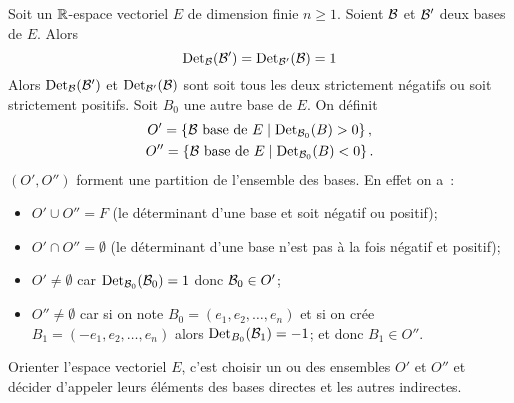 Soit un \(\mathbb{R}\)-espace vectoriel \(E\) de dimension finie \(n\geqslant 
1\). Soient \(\mathcal{B}\) et \(\mathcal{B}'\) deux bases de \(E\). Alors
\begin{equation}
  \operatorname{Det}_{\mathcal{B}}(\mathcal{B}') =  \operatorname{Det}_{\mathcal{B}'}(\mathcal{B}) = 1
\end{equation}
Alors \(\operatorname{Det}_{\mathcal{B}}(\mathcal{B}')\) et \(\operatorname{Det}_{\mathcal{B}'}(\mathcal{B})\) sont soit tous les deux 
strictement négatifs ou soit strictement positifs. Soit \(B_0\) une 
autre base de \(E\). On définit
\begin{gather}
  O'=\left\{\mathcal{B} \text{~base de~} E\mathrel{}\middle|\mathrel{}\operatorname{Det}_{\mathcal{B}_0}(B)>0\right\},\\
  O''=\left\{\mathcal{B} \text{~base de~} E\mathrel{}\middle|\mathrel{}\operatorname{Det}_{\mathcal{B}_0}(B)<0\right\}.
\end{gather}
\((O',O'')\) forment une partition de l'ensemble des bases. En effet on 
a~:
\begin{itemize}
  \item \(O' \cup O'' = F\) (le déterminant d'une base et soit négatif 
    ou positif);
  \item \(O' \cap O'' = \emptyset\) (le déterminant d'une base n'est pas 
    à la fois négatif et positif);
  \item \(O' \neq \emptyset\) car \(\operatorname{Det}_{\mathcal{B}_0}(\mathcal{B}_0)=1\) donc \(\mathcal{B}_0 
    \in O'\);
  \item \(O'' \neq \emptyset\)  car si on note \(B_0=(e_1, e_2, \ldots, 
    e_n)\) et si on crée \(B_1 = (-e_1, e_2, \ldots, e_n)\) alors 
    \(\operatorname{Det}_{B_0}(\mathcal{B}_1) = -1\); et donc \(B_1 \in O''\).
\end{itemize}

\begin{defdef}
  Orienter l'espace vectoriel \(E\), c'est choisir un ou des ensembles 
  \(O'\) et \(O''\) et décider d'appeler leurs éléments des bases 
  directes et les autres indirectes.
\end{defdef}
